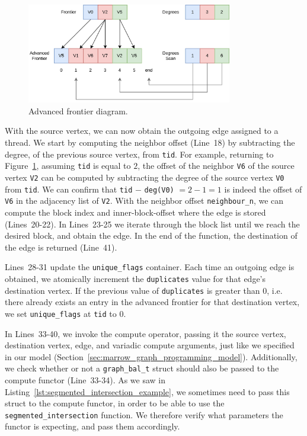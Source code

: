 \begin{figure}[t]
  \centering
    \includegraphics[width=0.8\textwidth]{Chapters/Figures/Images/af_binary_search.png}
    \caption{Advanced frontier diagram.}
\label{fig:advanced_frontier_binary_search}
\end{figure}

With the source vertex, we can now obtain the outgoing edge assigned to a thread.  We start by computing the neighbor offset (Line~18) by subtracting the degree, of the previous source vertex, from \texttt{tid}. For example, returning to Figure~\ref{fig:advanced_frontier_binary_search}, assuming \texttt{tid} is equal to $2$, the offset of the neighbor \texttt{V6} of the source vertex \texttt{V2} can be computed by subtracting the degree of the source vertex \texttt{V0} from \texttt{tid}. We can confirm that \texttt{tid} $-$ \texttt{deg(V0)} $ = 2 - 1 = 1$ is indeed the offset of \texttt{V6} in the adjacency list of \texttt{V2}. With the neighbor offset \texttt{neighbour\_n}, we can compute the block index and inner-block-offset where the edge is stored (Lines~20-22). In Lines~23-25 we iterate through the block list until we reach the desired block, and obtain the edge. In the end of the function, the destination of the edge is returned (Line~41).

Lines~28-31 update the \texttt{unique\_flags} container. Each time an outgoing edge is obtained, we atomically increment the \texttt{duplicates} value for that edge's destination vertex. If the previous value of \texttt{duplicates} is greater than $0$, i.e. there already exists an entry in the advanced frontier for that destination vertex, we set \texttt{unique\_flags} at \texttt{tid} to $0$.

In Lines~33-40, we invoke the compute operator, passing it the source vertex, destination vertex, edge, and variadic compute arguments, just like we specified in our model  (Section~\ref{sec:marrow_graph_programming_model}). Additionally, we check whether or not a \texttt{graph\_bal\_t} struct should also be passed to the compute functor (Line~33-34). As we saw in Listing~\ref{lst:segmented_intersection_example}, we sometimes need to pass this struct to the compute functor, in order to be able to use the \texttt{segmented\_intersection} function. We therefore verify what parameters the functor is expecting, and pass them accordingly.

